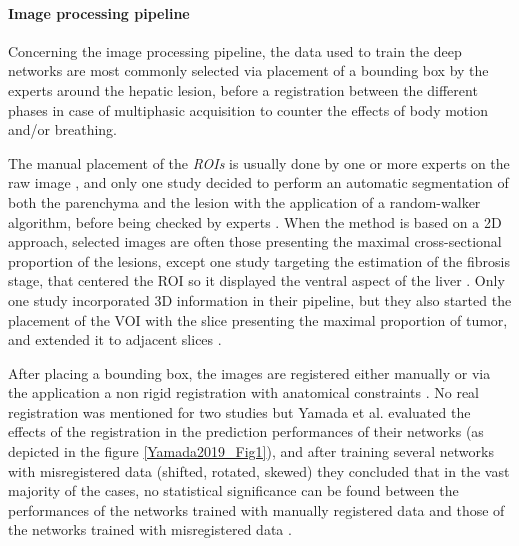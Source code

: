 \documentclass[]{article}
\let\oldparagraph\paragraph
\renewcommand{\paragraph}[1]{\oldparagraph{#1}\mbox{}}
\begin{document}
\paragraph{Image processing pipeline}\label{image-processing-pipeline}

Concerning the image processing pipeline, the data used to train the
deep networks are most commonly selected via placement of a bounding box
by the experts around the hepatic lesion, before a registration between
the different phases in case of multiphasic acquisition to counter the
effects of body motion and/or breathing.

The manual placement of the \emph{ROIs} is usually done by one or more
experts on the raw image \cite{Yamada2019,Wang2018,Yasaka2018a,Yasaka2018,WANG2019}, and only
one study decided to perform an automatic segmentation of both the
parenchyma and the lesion with the application of a random-walker
algorithm, before being checked by experts \cite{Liang2018}. When the method is based on a 2D approach, selected images are
often those presenting the maximal cross-sectional proportion of the
lesions, except one study targeting the estimation of the fibrosis
stage, that centered the ROI so it displayed the ventral aspect
of the liver \cite{Yasaka2018a}. Only one study
incorporated 3D information in their pipeline, but they also started the
placement of the VOI with the slice presenting the maximal
proportion of tumor, and extended it to adjacent slices \cite{Yang2019}.

After placing a bounding box, the images are registered either manually \cite{Yamada2019,WANG2019,Wang2018} or
via the application a non rigid registration with anatomical constraints \cite{Liang2018}. No real registration was mentioned for
two studies \cite{Peng2020,Yasaka2018a} but
Yamada et al. evaluated the effects of the registration in the
prediction performances of their networks (as depicted in the figure \ref{Yamada2019_Fig1}), and after training several networks with misregistered data
(shifted, rotated, skewed) they concluded that in the vast majority of
the cases, no statistical significance can be found between the
performances of the networks trained with manually registered data and
those of the networks trained with misregistered data \cite{Yamada2019}.
\end{document}
